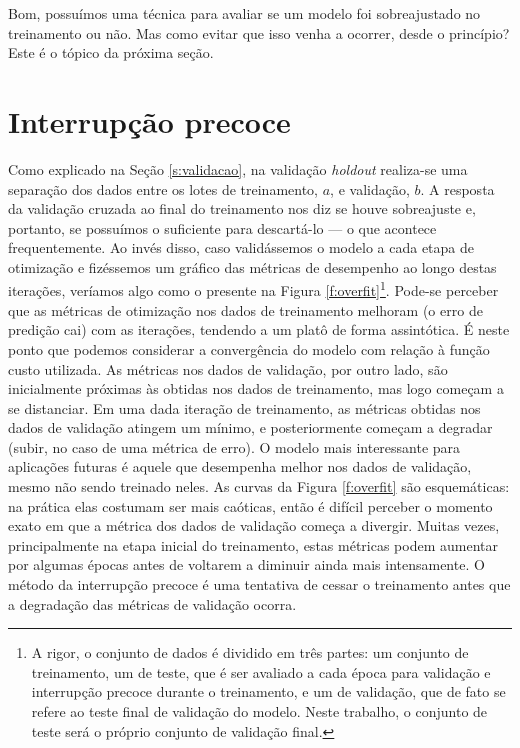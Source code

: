       Bom, possuímos uma técnica para avaliar se um modelo foi sobreajustado no treinamento ou não. Mas como evitar que isso venha a ocorrer, desde o princípio? Este é o tópico da próxima seção.


  \section{Interrupção precoce} \label{s:interrupcao_precoce}

    Como explicado na Seção \ref{s:validacao}, na validação \textit{holdout} realiza-se uma separação dos dados entre os lotes de treinamento, $a$, e validação, $b$. A resposta da validação cruzada ao final do treinamento nos diz se houve sobreajuste e, portanto, se possuímos o suficiente para descartá-lo --- o que acontece frequentemente. Ao invés disso, caso validássemos o modelo a cada etapa de otimização e fizéssemos um gráfico das métricas de desempenho ao longo destas iterações, veríamos algo como o presente na Figura \ref{f:overfit}\footnote{A rigor, o conjunto de dados é dividido em três partes: um conjunto de treinamento, um de teste, que é ser avaliado a cada época para validação e interrupção precoce durante o treinamento, e um de validação, que de fato se refere ao teste final de validação do modelo. Neste trabalho, o conjunto de teste será o próprio conjunto de validação final.}.
    Pode-se perceber que as métricas de otimização nos dados de treinamento melhoram (o erro de predição cai) com as iterações, tendendo a um platô de forma assintótica. É neste ponto que podemos considerar a convergência do modelo com relação à função custo utilizada. As métricas nos dados de validação, por outro lado, são inicialmente próximas às obtidas nos dados de treinamento, mas logo começam a se distanciar. Em uma dada iteração de treinamento, as métricas obtidas nos dados de validação atingem um mínimo, e posteriormente começam a degradar (subir, no caso de uma métrica de erro). O modelo mais interessante para aplicações futuras é aquele que desempenha melhor nos dados de validação, mesmo não sendo treinado neles. As curvas da Figura \ref{f:overfit} são esquemáticas: na prática elas costumam ser mais caóticas, então é difícil perceber o momento exato em que a métrica dos dados de validação começa a divergir. Muitas vezes, principalmente na etapa inicial do treinamento, estas métricas podem aumentar por algumas épocas antes de voltarem a diminuir ainda mais intensamente. O método da interrupção precoce é uma tentativa de cessar o treinamento antes que a degradação das métricas de validação ocorra.

